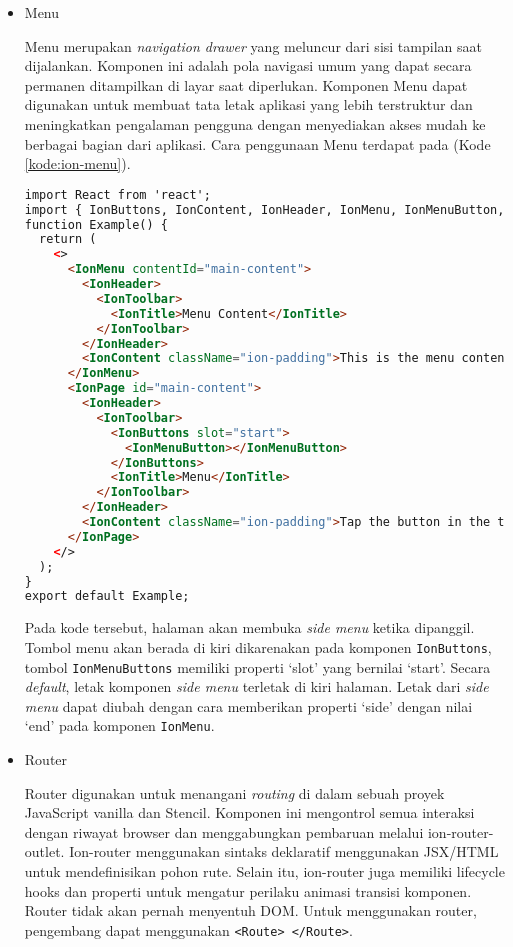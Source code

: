\documentclass[a4paper,twoside]{article}
\begin{document}
\begin{enumerate}
\begin{itemize}
\begin{itemize}
        \item Menu

        Menu merupakan \textit{navigation drawer} yang meluncur dari sisi tampilan saat dijalankan. Komponen ini adalah pola navigasi umum yang dapat secara permanen ditampilkan di layar saat diperlukan. Komponen Menu dapat digunakan untuk membuat tata letak aplikasi yang lebih terstruktur dan meningkatkan pengalaman pengguna dengan menyediakan akses mudah ke berbagai bagian dari aplikasi. Cara penggunaan Menu terdapat pada (Kode \ref{kode:ion-menu}).

\begin{lstlisting}[language=HTML, caption=Contoh Kode Penggunaan Menu, label=kode:ion-menu, breaklines=true]
import React from 'react';
import { IonButtons, IonContent, IonHeader, IonMenu, IonMenuButton, IonPage, IonTitle, IonToolbar } from '@ionic/react';
function Example() {
  return (
    <>
      <IonMenu contentId="main-content">
        <IonHeader>
          <IonToolbar>
            <IonTitle>Menu Content</IonTitle>
          </IonToolbar>
        </IonHeader>
        <IonContent className="ion-padding">This is the menu content.</IonContent>
      </IonMenu>
      <IonPage id="main-content">
        <IonHeader>
          <IonToolbar>
            <IonButtons slot="start">
              <IonMenuButton></IonMenuButton>
            </IonButtons>
            <IonTitle>Menu</IonTitle>
          </IonToolbar>
        </IonHeader>
        <IonContent className="ion-padding">Tap the button in the toolbar to open the menu.</IonContent>
      </IonPage>
    </>
  );
}
export default Example;
\end{lstlisting}

Pada kode tersebut, halaman akan membuka \textit{side menu} ketika dipanggil. Tombol menu akan berada di kiri dikarenakan pada komponen \texttt{IonButtons}, tombol \texttt{IonMenuButtons} memiliki properti `slot' yang bernilai `start'. Secara \textit{default}, letak komponen \textit{side menu} terletak di kiri halaman. Letak dari \textit{side menu} dapat diubah dengan cara memberikan properti `side' dengan nilai `end' pada komponen \texttt{IonMenu}.

    \item Router

    Router digunakan untuk menangani \textit{routing} di dalam sebuah proyek JavaScript vanilla dan Stencil. Komponen ini mengontrol semua interaksi dengan riwayat browser dan menggabungkan pembaruan melalui ion-router-outlet. Ion-router menggunakan sintaks deklaratif menggunakan JSX/HTML untuk mendefinisikan pohon rute. Selain itu, ion-router juga memiliki lifecycle hooks dan properti untuk mengatur perilaku animasi transisi komponen. Router tidak akan pernah menyentuh DOM. Untuk menggunakan router, pengembang dapat menggunakan \texttt{<Route> </Route>}.


\end{itemize}
\end{itemize}
\end{enumerate}
\end{document}
